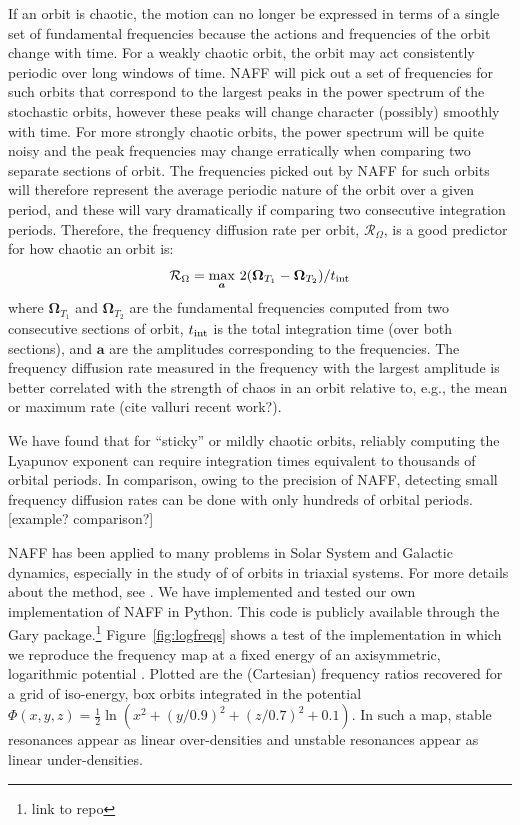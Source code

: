 \documentclass[letterpaper,12pt,preprint]{aastex}
\newcommand{\bs}[1]{\boldsymbol{#1}}
\newcommand{\inttime}{t_{\rm int}}
\newcommand{\fdrate}{\mathcal{R}_\Omega}
\begin{document}
If an orbit is chaotic, the motion can no longer be expressed in terms of a single set of fundamental frequencies because the actions and frequencies of the orbit change with time. For a weakly chaotic orbit, the orbit may act consistently periodic over long windows of time. NAFF will pick out a set of frequencies for such orbits that correspond to the largest peaks in the power spectrum of the stochastic orbits, however these peaks will change character (possibly) smoothly with time. For more strongly chaotic orbits, the power spectrum will be quite noisy and the peak frequencies may change erratically when comparing two separate sections of orbit. The frequencies picked out by NAFF for such orbits will therefore represent the average periodic nature of the orbit over a given period, and these will vary dramatically if comparing two consecutive integration periods. Therefore, the frequency diffusion rate per orbit, $\fdrate$, is a good predictor for how chaotic an orbit is:
\begin{equation}
	\fdrate = \max_{\bs{a}}\,2(\bs{\Omega}_{T_1} - \bs{\Omega}_{T_2}) / \inttime \label{eq:fdrate}
\end{equation}
where $\bs{\Omega}_{T_1}$ and $\bs{\Omega}_{T_2}$ are the fundamental frequencies computed from two consecutive sections of orbit, $\inttime$ is the total integration time (over both sections), and $\bs{a}$ are the amplitudes corresponding to the frequencies. The frequency diffusion rate measured in the frequency with the largest amplitude is better correlated with the strength of chaos in an orbit relative to, e.g., the mean or maximum rate (cite valluri recent work?).

We have found that for ``sticky'' or mildly chaotic orbits, reliably computing the Lyapunov exponent can require integration times equivalent to thousands of orbital periods. In comparison, owing to the precision of NAFF, detecting small frequency diffusion rates can be done with only hundreds of orbital periods. [example? comparison?] 

NAFF has been applied to many problems in Solar System and Galactic dynamics, especially in the study of of orbits in triaxial systems. For more details about the method, see \cite{papaphillipou, laskar, etc.}. We have implemented and tested our own implementation of NAFF in Python. This code is publicly available through the Gary package.\footnote{link to repo} Figure~\ref{fig:logfreqs} shows a test of the implementation in which we reproduce the frequency map at a fixed energy of an axisymmetric, logarithmic potential \cite[][pg. 260, Figure~3.45]{binneytremaine}. Plotted are the (Cartesian) frequency ratios recovered for a grid of iso-energy, box orbits integrated in the potential $\Phi(x,y,z) = \frac{1}{2}\ln\left(x^2 + (y/0.9)^2 + (z/0.7)^2 + 0.1\right)$. In such a map, stable resonances appear as linear over-densities and unstable resonances appear as linear under-densities. 
\end{document}
